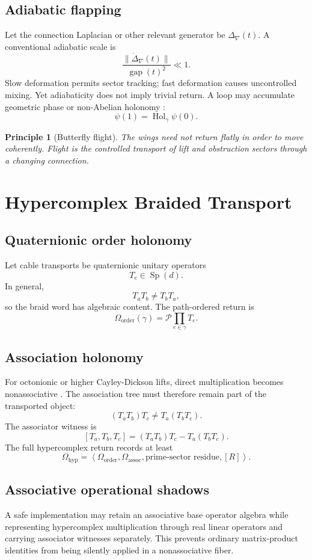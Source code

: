 \documentclass[12pt,openany]{book}
\newtheorem{principle}[definition]{Principle}
\theoremstyle{remark}
\DeclareMathOperator{\Hol}{Hol}
\newcommand{\Remainder}{[R]}
\newcommand{\typedtuple}[1]{\left\langle #1 \right\rangle}
\begin{document}
\section{Adiabatic flapping}
Let the connection Laplacian or other relevant generator be $\Delta_\nabla(t)$. A conventional adiabatic scale is \cite{BornFock,Kato1950}
\[
\frac{\|\dot\Delta_\nabla(t)\|}{\operatorname{gap}(t)^2}\ll1.
\]
Slow deformation permits sector tracking; fast deformation causes uncontrolled mixing. Yet adiabaticity does not imply trivial return. A loop may accumulate geometric phase or non-Abelian holonomy \cite{Berry1984,WilczekZee}:
\[
\psi(1)=\Hol_\gamma\psi(0).
\]

\begin{principle}[Butterfly flight]
The wings need not return flatly in order to move coherently. Flight is the controlled transport of lift and obstruction sectors through a changing connection.
\end{principle}

\chapter{Hypercomplex Braided Transport}
\label{ch:hypercomplex}

\section{Quaternionic order holonomy}
Let cable transports be quaternionic unitary operators
\[
T_e\in\operatorname{Sp}(d).
\]
In general,
\[
T_aT_b\neq T_bT_a,
\]
so the braid word has algebraic content. The path-ordered return is
\[
\Omega_{\mathrm{order}}(\gamma)
=\mathcal P\prod_{e\in\gamma}T_e.
\]

\section{Association holonomy}
For octonionic or higher Cayley-Dickson lifts, direct multiplication becomes nonassociative \cite{Baez2002}. The association tree must therefore remain part of the transported object:
\[
(T_aT_b)T_c\neq T_a(T_bT_c).
\]
The associator witness is
\[
[T_a,T_b,T_c]
=(T_aT_b)T_c-T_a(T_bT_c).
\]
The full hypercomplex return records at least
\[
\Omega_{\mathrm{hyp}}
=
\typedtuple{
\Omega_{\mathrm{order}},
\Omega_{\mathrm{assoc}},
\text{prime-sector residue},
\Remainder
}.
\]

\section{Associative operational shadows}
A safe implementation may retain an associative base operator algebra while representing hypercomplex multiplication through real linear operators and carrying associator witnesses separately. This prevents ordinary matrix-product identities from being silently applied in a nonassociative fiber.
\end{document}
